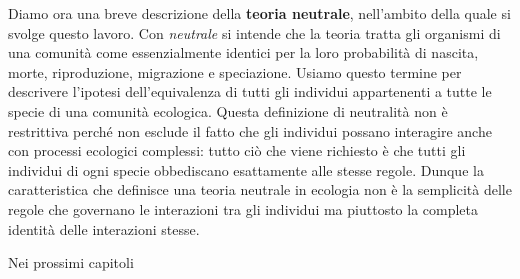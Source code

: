 Diamo ora una breve descrizione della \textbf{teoria neutrale}, nell'ambito della quale si svolge questo lavoro\cite{Hubbell}. Con \emph{neutrale} si intende che la teoria tratta gli organismi di una comunità come essenzialmente identici per la loro probabilità di nascita, morte, riproduzione, migrazione e speciazione. Usiamo questo termine per descrivere l'ipotesi dell'equivalenza di tutti gli individui appartenenti a tutte le specie di una comunità ecologica. Questa definizione di neutralità non è restrittiva perché non esclude il fatto che gli individui possano interagire anche con processi ecologici complessi: tutto ciò che viene richiesto è che tutti gli individui di ogni specie obbediscano esattamente alle stesse regole. Dunque la caratteristica che definisce una teoria neutrale in ecologia non è la semplicità delle regole che governano le interazioni tra gli individui ma piuttosto la completa identità delle interazioni stesse.

Nei prossimi capitoli 








%



           

